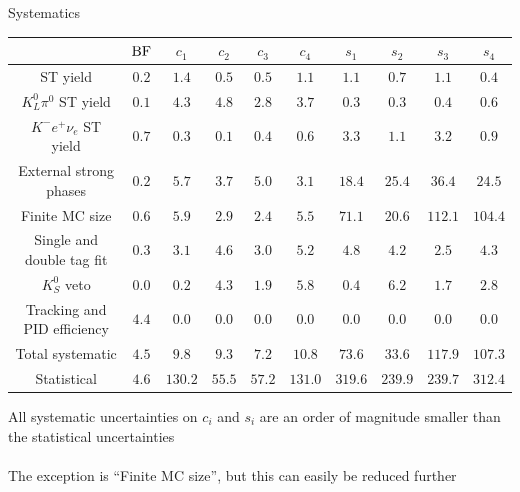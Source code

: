 \documentclass{beamer}
\begin{document}
\begin{frame}{Systematics}
  \centering
  \def\arraystretch{1.2}%
  \begingroup
  \tiny
  \begin{tabular}{cccccccccc}
    \hline
    & ${\rm BF}$ & $c_1$ & $c_2$ & $c_3$ & $c_4$ & $s_1$ & $s_2$ & $s_3$ & $s_4$ \\
    \hline
    ST yield & $0.2$ & $1.4$ & $0.5$ & $0.5$ & $1.1$ & $1.1$ & $0.7$ & $1.1$ & $0.4$ \\
    $K_L^0\pi^0$ ST yield & $0.1$ & $4.3$ & $4.8$ & $2.8$ & $3.7$ & $0.3$ & $0.3$ & $0.4$ & $0.6$ \\
    $K^- e^+\nu_e$ ST yield & $0.7$ & $0.3$ & $0.1$ & $0.4$ & $0.6$ & $3.3$ & $1.1$ & $3.2$ & $0.9$ \\
    External strong phases & $0.2$ & $5.7$ & $3.7$ & $5.0$ & $3.1$ & $18.4$ & $25.4$ & $36.4$ & $24.5$ \\
    Finite MC size & $0.6$ & $5.9$ & $2.9$ & $2.4$ & $5.5$ & $71.1$ & $20.6$ & $112.1$ & $104.4$ \\
    Single and double tag fit & $0.3$ & $3.1$ & $4.6$ & $3.0$ & $5.2$ & $4.8$ & $4.2$ & $2.5$ & $4.3$ \\
    $K_S^0$ veto  & $0.0$ & $0.2$ & $4.3$ & $1.9$ & $5.8$ & $0.4$ & $6.2$ & $1.7$ & $2.8$ \\
    Tracking and PID efficiency & $4.4$ & $0.0$ & $0.0$ & $0.0$ & $0.0$ & $0.0$ & $0.0$ & $0.0$ & $0.0$ \\
    \hline
    Total systematic & $4.5$ & $9.8$ & $9.3$ & $7.2$ & $10.8$ & $73.6$ & $33.6$ & $117.9$ & $107.3$ \\
    \hline
    Statistical & $4.6$ & $130.2$ & $55.5$ & $57.2$ & $131.0$ & $319.6$ & $239.9$ & $239.7$ & $312.4$ \\
    \hline
  \end{tabular}
  \endgroup
  \vspace{1.0cm}
  \begin{center}
    All systematic uncertainties on $c_i$ and $s_i$ are an order of magnitude smaller than the statistical uncertainties\\~\\
    The exception is ``Finite MC size'', but this can easily be reduced further
  \end{center}
\end{frame}
\end{document}
